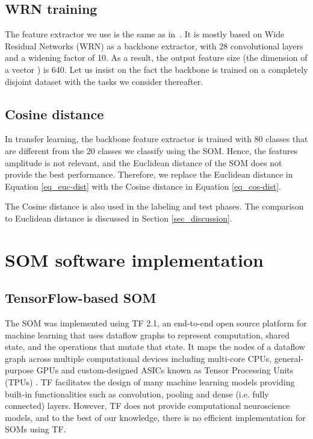 \documentclass[runningheads]{llncs}
\begin{document}
\subsection{WRN training}

The feature extractor we use is the same as in~\cite{hu2020accurate_few_shot}. It is mostly based on Wide Residual Networks (WRN) \cite{zagoruyko2016wrn} as a backbone extractor, with 28 convolutional layers and a widening factor of 10. As a result, the output feature size (the dimension of a vector ) is 640. Let us insist on the fact the backbone is trained on a completely disjoint dataset with the tasks we consider thereafter.

\subsection{Cosine distance}
In transfer learning, the backbone feature extractor is trained with 80 classes that are different from the 20 classes we classify using the SOM. Hence, the features amplitude is not relevant, and the Euclidean distance of the SOM does not provide the best performance. Therefore, we replace the Euclidean distance in Equation \ref{eq_euc-dist} with the Cosine distance in Equation \ref{eq_cos-dist}.



The Cosine distance is also used in the labeling and test phases. The comparison to Euclidean distance is discussed in Section \ref{sec_discussion}.



\section{SOM software implementation}
\label{sec_tf-som}

\subsection{TensorFlow-based SOM}
The SOM was implemented using TF \cite{abadi2016tensorflow} 2.1, an end-to-end open source platform for machine learning that uses dataflow graphs to represent computation, shared state, and the operations that mutate that state. It maps the nodes of a dataflow graph across multiple computational devices including multi-core CPUs, general-purpose GPUs and custom-designed ASICs known as Tensor Processing Units (TPUs) \cite{abadi2016tensorflow}. TF facilitates the design of many machine learning models providing built-in functionalities such as convolution, pooling and dense (i.e. fully connected) layers.
However, TF does not provide computational neuroscience models, and to the best of our knowledge, there is no efficient implementation for SOMs using TF.
\end{document}
